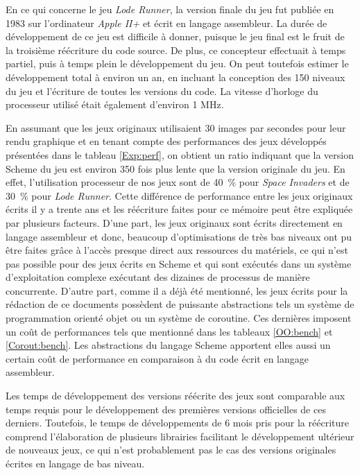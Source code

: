 \documentclass[12pt,twoside,letterpaper,francais]{book}
\begin{document}
En ce qui concerne le jeu \textit{Lode Runner}, la version finale du
jeu fut publiée en 1983 sur l'ordinateur \textit{Apple II+} et écrit
en langage assembleur. La durée de développement de ce jeu est
difficile à donner, puisque le jeu final est le fruit de la troisième
réécriture du code source. De plus, ce concepteur effectuait à temps
partiel, puis à temps plein le développement du jeu. On peut toutefois
estimer le développement total à environ un an, en incluant la
conception des 150 niveaux du jeu et l'écriture de toutes les versions
du code. La vitesse d'horloge du processeur utilisé était également
d'environ 1 MHz.

En assumant que les jeux originaux utilisaient 30 images par secondes
pour leur rendu graphique et en tenant compte des performances des
jeux développés présentées dans le tableau \ref{Exp:perf}, on obtient
un ratio indiquant que la version Scheme du jeu est environ 350 fois
plus lente que la version originale du jeu. En effet, l'utilisation
processeur de nos jeux sont de 40~\% pour \textit{Space Invaders} et
de 30~\% pour \textit{Lode Runner}. Cette différence de performance
entre les jeux originaux écrits il y a trente ans et les réécriture
faites pour ce mémoire peut être expliquée par plusieurs
facteurs. D'une part, les jeux originaux sont écrits directement en
langage assembleur et donc, beaucoup d'optimisations de très bas
niveaux ont pu être faites grâce à l'accès presque direct aux
ressources du matériels, ce qui n'est pas possible pour des jeux
écrits en Scheme et qui sont exécutés dans un système d'exploitation
complexe exécutant des dizaines de processus de manière
concurrente. D'autre part, comme il a déjà été mentionné, les jeux
écrits pour la rédaction de ce documents possèdent de puissante
abstractions tels un système de programmation orienté objet ou un
système de coroutine. Ces dernières imposent un coût de performances
tels que mentionné dans les tableaux \ref{OO:bench} et
\ref{Corout:bench}.  Les abstractions du langage Scheme apportent
elles aussi un certain coût de performance en comparaison à du code
écrit en langage assembleur.

Les temps de développement des versions réécrite des jeux sont
comparable aux temps requis pour le développement des premières
versions officielles de ces derniers. Toutefois, le temps de
développements de 6 mois pris pour la réécriture comprend
l'élaboration de plusieurs librairies facilitant le développement
ultérieur de nouveaux jeux, ce qui n'est probablement pas le cas des
versions originales écrites en langage de bas niveau.
\end{document}
